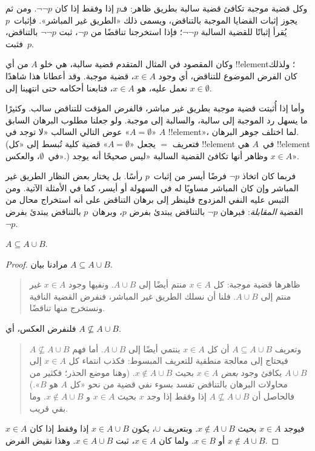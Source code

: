 \documentclass[../../../include/open-logic-section]{subfiles}
\begin{document}
وكل قضية موجبة تكافئ قضية سالبة بطريق ظاهر: فـ$p$ إذا وفقط إذا كان
$\lnot\lnot p$. ومن ثم يجوز إثبات القضايا الموجبة بالتناقض، ويسمى
ذلك «الطريق غير المباشر». فإثبات~$p$ يُقرأ إثباتًا للقضية السالبة
$\lnot\lnot p$؛ فإذا استخرجنا تناقضًا من $\lnot p$، ثبت
$\lnot\lnot p$ بالتناقض، فثبت~$p$.

وكان المقصود في المثال المتقدم قضية سالبة، هي خلو $A$ من أي
!!{element}؛ ولذلك كان الفرض الموضوع للتناقض، أي وجود $x \in A$،
قضية موجبة. وقد أعطانا هذا شاهدًا نعمل عليه، هو $x \in A$، فتابعنا
أحكامه حتى انتهينا إلى $x \in \emptyset$.

وأما إذا أُثبتت قضية موجبة بطريق غير مباشر، فالفرض المؤقت للتناقض
سالب. وكثيرًا ما يسهل رد الموجبة إلى سالبة، والسالبة إلى موجبة. ولو
جعلنا مطلوب البرهان السابق «$A = \emptyset$» عوض التالي السالب «لا
توجد في $A$ !!{element}»، لما اختلف جوهر البرهان. (فتعريف $=$ يجعل
«$A = \emptyset$» قضية كلية تُبسط إلى «كل !!{element} في~$A$ هي
!!{element} في~$\emptyset$، والعكس».) وظاهر أنها تكافئ القضية السالبة
«ليس صحيحًا أنه يوجد $x \in A$».

فربما كان اتخاذ $\lnot p$ فرضًا أيسر من إثبات~$p$ رأسًا. بل يختار
بعض النظار الطريق غير المباشر وإن كان المباشر مساويًا له في السهولة
أو أيسر، كما في الأمثلة الآتية. ومن التبس عليه النفي المزدوج فلينظر
إلى برهان التناقض على أنه استخراج محال من القضية \emph{المقابلة}:
فبرهان $\lnot p$ بالتناقض يبتدئ بفرض $p$، وبرهان~$p$ بالتناقض يبتدئ
بفرض~$\lnot p$.

\begin{prop}
$A \subseteq A \cup B$.
\end{prop}

\begin{proof}
  مرادنا بيان $A \subseteq A \cup B$.
  \begin{quote}
    ظاهرها قضية موجبة: كل $x \in A$ منتم أيضًا إلى $A \cup B$.
    ونفيها وجود $x \in A$ غير منتم إلى $A \cup B$. فلنا أن نسلك
    الطريق غير المباشر، فنفرض القضية النافية ونستخرج منها تناقضًا.
    \end{quote}
  فلنفرض العكس، أي $A \nsubseteq A \cup B$.
  \begin{quote}
    وتعريف $A \subseteq A \cup B$ أن كل $x \in A$ ينتمي أيضًا إلى
    $A \cup B$. أما فهم $A \nsubseteq A \cup B$ فيحتاج إلى معالجة
    منطقية للتعريف المبسوط: فكذب انتماء كل $x \in A$ إلى
    $A \cup B$ يكافئ وجود \emph{بعض} $x \in A$ بحيث
    $x \notin A \cup B$. (وهنا موضع الحذر؛ فكثير من محاولات البرهان
    بالتناقض تفسد بسوء نفي قضية من نحو «كل $A$ هو $B$».) فالحاصل أن
    $A \nsubseteq A \cup B$ إذا وفقط إذا وجد $x$ بحيث $x \in A$ و
    $x \notin A \cup B$. وما بقي قريب.
  \end{quote}
  فيوجد $x \in A$ بحيث $x \notin A \cup B$. وبتعريف $\cup$، يكون
  $x \in A \cup B$ إذا وفقط إذا كان $x \in A$ أو $x \in B$.
  ولما كان $x \in A$، ثبت $x \in A \cup B$. وهذا نقيض الفرض
  $x \notin A \cup B$.
\end{proof}
\end{document}
